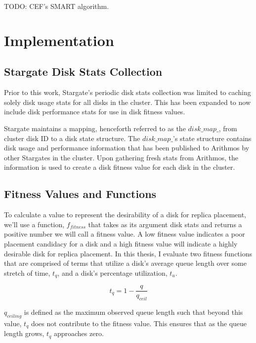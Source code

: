 \documentclass[12pt]{article}
\begin{document}
TODO:  CEF's SMART algorithm.


\section{Implementation}

  \subsection{Stargate Disk Stats Collection}

  Prior to this work, Stargate's periodic disk stats collection was limited to
  caching solely disk usage stats for all disks in the cluster.  This has been
  expanded to now include disk performance stats for use in disk fitness
  values.

  Stargate maintains a mapping, henceforth referred to as the $disk\_map\_$,
  from cluster disk ID to a disk state structure. The $disk\_map\_$'s state
  structure contains disk usage and performance information that has been
  published to Arithmos by other Stargates in the cluster. Upon gathering fresh
  stats from Arithmos, the information is used to create a disk fitness value
  for each disk in the cluster.

  \subsection{Fitness Values and Functions}

  To calculate a value to represent the desirability of a disk for replica
  placement, we'll use a function, $f_{fitness}$ that takes as its argument
  disk stats and returns a positive number we will call a fitness value. A low
  fitness value indicates a poor placement candidacy for a disk and a high
  fitness value will indicate a highly desirable disk for replica placement. In
  this thesis, I evaluate two fitness functions that are comprised of terms
  that utilize a disk's average queue length over some stretch of time,
  $t_{q}$, and a disk's percentage utilization, $t_{u}$.

  \begin{equation}
    t_{q} = 1 - \frac{q}{q_{ceil}}
  \end{equation}

  $q_{ceiling}$ is defined as the maximum observed queue length such that
  beyond this value, $t_{q}$ does not contribute to the fitness
  value. This ensures that as the queue length grows, $t_{q}$
  approaches zero. 
\end{document}
